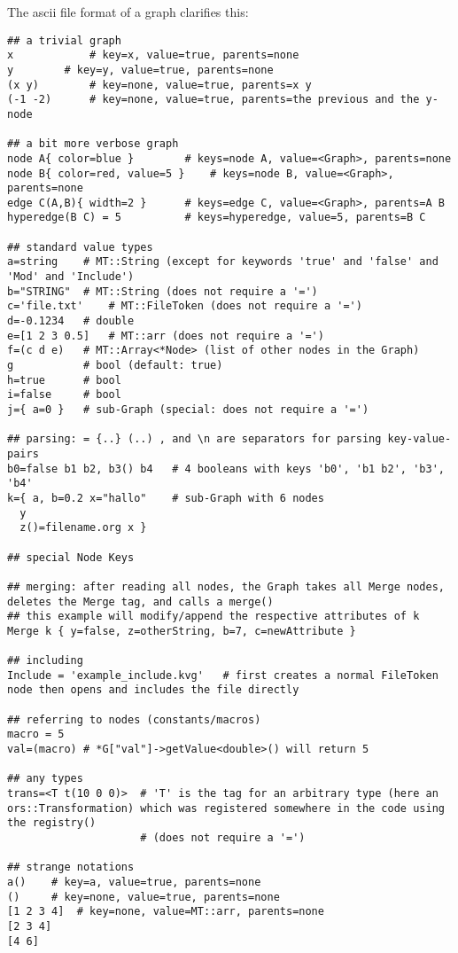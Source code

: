 \documentclass[10pt,fleqn,twoside]{article}
\begin{document}
The ascii file format of a graph clarifies this:
\begin{shaded}
\begin{Verbatim}[fontfamily=courier,fontsize=\tiny]
## a trivial graph
x    	     # key=x, value=true, parents=none
y	     # key=y, value=true, parents=none
(x y)	     # key=none, value=true, parents=x y
(-1 -2)	     # key=none, value=true, parents=the previous and the y-node

## a bit more verbose graph
node A{ color=blue }		# keys=node A, value=<Graph>, parents=none
node B{ color=red, value=5 }	# keys=node B, value=<Graph>, parents=none
edge C(A,B){ width=2 }	   	# keys=edge C, value=<Graph>, parents=A B
hyperedge(B C) = 5   		# keys=hyperedge, value=5, parents=B C

## standard value types
a=string	# MT::String (except for keywords 'true' and 'false' and 'Mod' and 'Include')
b="STRING"	# MT::String (does not require a '=')
c='file.txt'	# MT::FileToken (does not require a '=')
d=-0.1234	# double
e=[1 2 3 0.5]	# MT::arr (does not require a '=')
f=(c d e)	# MT::Array<*Node> (list of other nodes in the Graph)
g      		# bool (default: true)
h=true		# bool
i=false		# bool
j={ a=0 }	# sub-Graph (special: does not require a '=')

## parsing: = {..} (..) , and \n are separators for parsing key-value-pairs
b0=false b1 b2, b3() b4   # 4 booleans with keys 'b0', 'b1 b2', 'b3', 'b4'
k={ a, b=0.2 x="hallo"	  # sub-Graph with 6 nodes
  y
  z()=filename.org x }

## special Node Keys

## merging: after reading all nodes, the Graph takes all Merge nodes, deletes the Merge tag, and calls a merge()
## this example will modify/append the respective attributes of k
Merge k { y=false, z=otherString, b=7, c=newAttribute }

## including
Include = 'example_include.kvg'   # first creates a normal FileToken node then opens and includes the file directly

## referring to nodes (constants/macros)
macro = 5
val=(macro) # *G["val"]->getValue<double>() will return 5

## any types
trans=<T t(10 0 0)>  # 'T' is the tag for an arbitrary type (here an ors::Transformation) which was registered somewhere in the code using the registry()
                     # (does not require a '=')

## strange notations
a()	   # key=a, value=true, parents=none
()	   # key=none, value=true, parents=none
[1 2 3 4]  # key=none, value=MT::arr, parents=none
[2 3 4]
[4 6]
\end{Verbatim}
\end{shaded}
\end{document}
